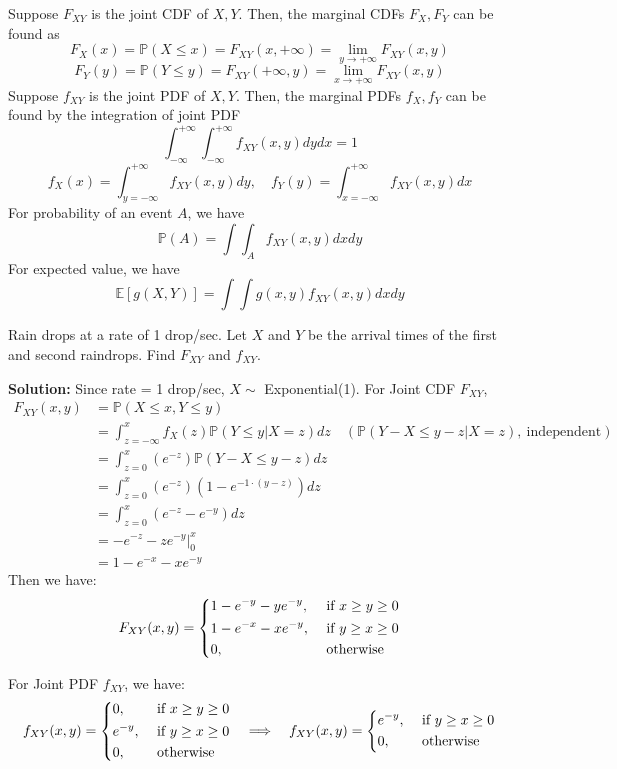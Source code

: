 Suppose \(F_{XY}\) is the joint CDF of \(X, Y\). Then, the marginal CDFs \(F_X, F_Y\) can be found as 
\[
    F_X(x) = \mathbb{P}(X \leq x) = F_{XY}(x, +\infty) = \lim_{y \to +\infty} F_{XY}(x, y)
\]
\[
    F_Y(y) = \mathbb{P}(Y \leq y) = F_{XY}(+\infty, y) = \lim_{x \to +\infty} F_{XY}(x, y)
\]
Suppose \(f_{XY}\) is the joint PDF of \(X, Y\). Then, the marginal PDFs \(f_X, f_Y\) can be found by the integration of joint PDF
\[
    \int_{-\infty}^{+\infty} \int_{-\infty}^{+\infty} f_{XY}(x, y) dy dx = 1
\]
\[
    f_X(x) = \int_{y = -\infty}^{+\infty} f_{XY}(x, y) dy ,\quad f_Y(y) = \int_{x = -\infty}^{+\infty} f_{XY}(x, y) dx 
\]
For probability of an event \(A\), we have 
\[
    \mathbb{P}(A) = \int \int_A f_{XY} (x, y) dx dy
\]
For expected value, we have 
\[
    \mathbb{E}[g(X, Y)] = \int \int g(x, y) f_{XY} (x, y) dx dy
\]

\begin{eg}
    Rain drops at a rate of 1 drop/sec. Let \(X\) and \(Y\) be the arrival times of the first and second raindrops. Find \(F_{XY}\) and \(f_{XY}\). 

    \textbf{Solution:} 
    Since rate = 1 drop/sec, \(X \sim\) Exponential(1). For Joint CDF \(F_{XY}\), 
    \[
    \begin{aligned}
        F_{XY}(x, y) &= \mathbb{P}(X \leq x, Y \leq y) \\
        &= \int_{z = -\infty}^{x} f_X(z) \mathbb{P}(Y \leq y \vert X = z) dz \quad (\mathbb{P}(Y - X \leq y - z \vert X = z),\ \text{independent})\\
        &= \int_{z = 0}^{x} (e^{-z}) \mathbb{P}(Y - X \leq y - z) dz \\
        &= \int_{z = 0}^{x} (e^{-z}) (1 - e^{-1 \cdot (y - z)}) dz \\
        &= \int_{z = 0}^{x} (e^{-z} - e^{-y}) dz \\
        &= - e^{-z} - ze^{-y} \Big|_0^x \\
        &= 1 - e^{-x} - xe^{-y}
    \end{aligned}
    \]
    Then we have: 
    \[
        F_{XY}(x, y) = \begin{dcases}
            1 - e^{-y} - ye^{-y}, &\text{ if } x \geq y \geq 0 \\
            1 - e^{-x} - xe^{-y}, &\text{ if } y \geq x \geq 0 \\
            0, &\text{ otherwise} 
        \end{dcases}
    \]

    For Joint PDF \(f_{XY}\), we have: 
    \[
        f_{XY}(x, y) = \begin{dcases}
            0, &\text{ if } x \geq y \geq 0 \\
            e^{-y}, &\text{ if } y \geq x \geq 0 \\
            0, &\text{ otherwise} 
        \end{dcases}
        \quad\Longrightarrow\quad 
        f_{XY}(x, y) = \begin{dcases}
            e^{-y}, &\text{ if } y \geq x \geq 0 \\
            0, &\text{ otherwise} 
        \end{dcases}
    \]
\end{eg}

